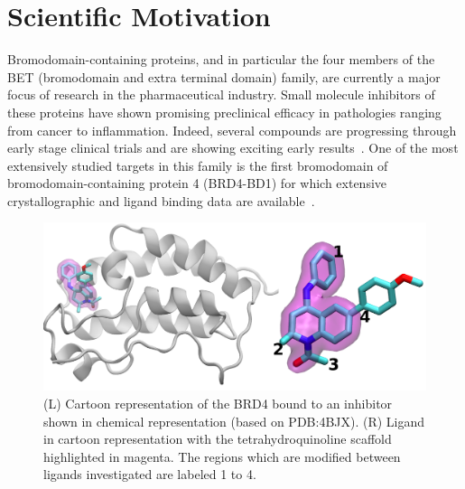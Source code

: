 \documentclass[conference]{IEEEtran}
\begin{document}

\section{Scientific Motivation}\label{sec:motivation}



Bromodomain-containing proteins, and in particular the four members of the BET
(bromodomain and extra terminal domain) family, are currently a major focus of
research in the pharmaceutical industry. Small molecule inhibitors of these
proteins have shown promising preclinical efficacy in pathologies ranging from
cancer to inflammation. Indeed, several compounds are progressing through
early stage clinical trials and are showing exciting early
results~\cite{Theodoulou2016}. One of the most extensively studied targets in
this family is the first bromodomain of bromodomain-containing protein 4
(BRD4-BD1) for which extensive crystallographic and ligand binding data are
available~\cite{Bamborough2012}.

\begin{figure}
  \centering
  \includegraphics[width=1.0\columnwidth]{./brd4.png}
  \caption{(L) Cartoon representation of the BRD4 bound to an inhibitor shown in 
  chemical representation (based on PDB:4BJX). (R) Ligand in cartoon representation 
  with the tetrahydroquinoline scaffold highlighted in magenta. The 
  regions which are modified between ligands investigated are labeled 1 to 4.}
  \label{fig:brd4}
  \vspace{-2em}
\end{figure}
\end{document}
